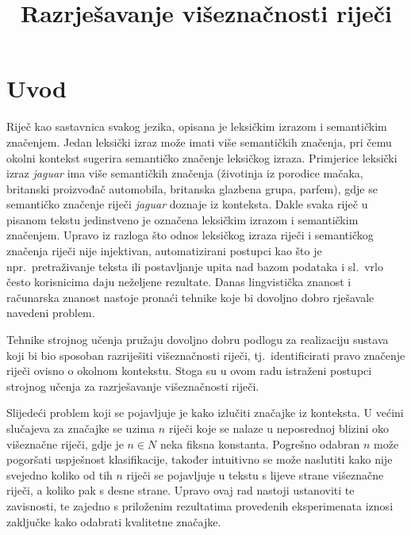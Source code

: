 \documentclass[10pt, a4paper]{article}
\title{Razrješavanje višeznačnosti riječi}
\begin{document}
\maketitleabstract

\section{Uvod}

Riječ kao sastavnica svakog jezika, opisana je leksičkim izrazom i semantičkim značenjem.
Jedan leksički izraz može imati više semantičkih značenja, pri čemu okolni kontekst
sugerira semantičko značenje leksičkog izraza. 
Primjerice leksički izraz \emph{jaguar} ima više semantičkih značenja
(životinja iz porodice mačaka, britanski proizvođač automobila, 
britanska glazbena grupa, parfem), gdje se semantičko značenje riječi \emph{jaguar}
doznaje iz konteksta. Dakle svaka riječ u pisanom tekstu jedinstveno je označena 
leksičkim izrazom i semantičkim značenjem. Upravo iz razloga što odnos 
leksičkog izraza riječi i semantičkog značenja riječi nije injektivan, 
automatizirani postupci kao što je npr.~pretraživanje teksta ili
postavljanje upita nad bazom podataka i sl.~vrlo često korisnicima 
daju neželjene rezultate. Danas lingvistička znanost i računarska znanost 
nastoje pronaći tehnike koje bi dovoljno dobro 
rješavale navedeni problem.

Tehnike strojnog učenja pružaju dovoljno dobru podlogu za realizaciju sustava
koji bi bio sposoban razriješiti višeznačnosti riječi, tj.~identificirati pravo
značenje riječi ovisno o okolnom kontekstu. Stoga su u ovom radu istraženi postupci
strojnog učenja za razrješavanje višeznačnosti riječi.

Slijedeći problem koji se pojavljuje je kako izlučiti značajke iz konteksta.
U većini slučajeva za značajke se uzima $n$ riječi koje se nalaze u neposrednoj blizini oko višeznačne riječi, gdje je $n \in N$ neka fiksna konstanta. Pogrešno odabran $n$ može pogoršati uspješnost klasifikacije, također intuitivno se može naslutiti kako nije svejedno koliko od tih $n$ riječi se pojavljuje u tekstu s lijeve strane višeznačne riječi, a koliko pak s desne strane.
Upravo ovaj rad nastoji ustanoviti te zavisnosti, te zajedno s priloženim rezultatima provedenih eksperimenata iznosi zaključke kako odabrati kvalitetne značajke.
\end{document}
